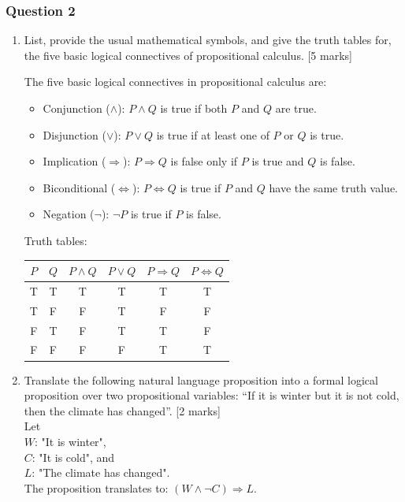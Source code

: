 \subsubsection{Question 2}
\begin{enumerate}
    \item[(a)] List, provide the usual mathematical symbols, and give the truth tables for, the five basic logical connectives of propositional calculus. [5 marks] \\
    {\color{blue}
    The five basic logical connectives in propositional calculus are:
    \begin{itemize}
        \item Conjunction ($\land$): $P \land Q$ is true if both $P$ and $Q$ are true.
        \item Disjunction ($\lor$): $P \lor Q$ is true if at least one of $P$ or $Q$ is true.
        \item Implication ($\Rightarrow$): $P \Rightarrow Q$ is false only if $P$ is true and $Q$ is false.
        \item Biconditional ($\Leftrightarrow$): $P \Leftrightarrow Q$ is true if $P$ and $Q$ have the same truth value.
        \item Negation ($\lnot$): $\lnot P$ is true if $P$ is false.
    \end{itemize}
    Truth tables:

    \begin{tabular}{|c|c|c|c|c|c|}
    \hline
    $P$ & $Q$ & $P \land Q$ & $P \lor Q$ & $P \Rightarrow Q$ & $P \Leftrightarrow Q$ \\
    \hline
    T & T & T & T & T & T \\
    T & F & F & T & F & F \\
    F & T & F & T & T & F \\
    F & F & F & F & T & T \\
    \hline
    \end{tabular}
    }
    \item[(b)] Translate the following natural language proposition into a formal logical proposition over two propositional variables: “If it is winter but it is not cold, then the climate has changed”. [2 marks] \\
    {\color{blue}
    Let \\
    $W$: "It is winter", \\
    $C$: "It is cold", and \\
    $L$: "The climate has changed". \\
    The proposition translates to: $(W \land \lnot C) \Rightarrow L$.
    }


\end{enumerate}
